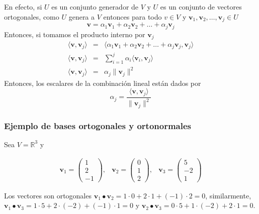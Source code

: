 \documentclass[
]{article}
\begin{document}
En efecto, si \(U\) es un conjunto generador de \(V\) y \(U\) es un
conjunto de vectores ortogonales, como \(U\) genera a \(V\) entonces
para todo \(v\in V\) y
\(\mathbf{v}_1,\mathbf{v}_2,\ldots,\mathbf{v}_j \in U\) \[
\mathbf{v}=\alpha_1 \mathbf{v}_1 + \alpha_2 \mathbf{v}_2 + \ldots + \alpha_j \mathbf{v}_j
\] Entonces, si tomamos el producto interno por \(\mathbf{v}_j\) \[
\begin{matrix}
\langle \mathbf{v}, \mathbf{v}_j \rangle  & = & 
  \langle \alpha_1 \mathbf{v}_1 + \alpha_2 \mathbf{v}_2 + \ldots + \alpha_j \mathbf{v}_j, \mathbf{v}_j \rangle \\
\langle \mathbf{v}, \mathbf{v}_j \rangle  & = & \sum_{i=1}^{j}\alpha_i \langle \mathbf{v}_i ,\mathbf{v}_j\rangle  \\
\langle \mathbf{v}, \mathbf{v}_j \rangle  & = & \alpha_j \|\mathbf{v}_j\|^2
\end{matrix}
\] Entonces, los escalares de la combinación lineal están dados por \[
\alpha_j = \frac{\langle \mathbf{v},\mathbf{v}_j  \rangle}{\|\mathbf{v}_j\|^2}
\]

\hypertarget{ejemplo-de-bases-ortogonales-y-ortonormales}{%
\subsubsection{Ejemplo de bases ortogonales y
ortonormales}\label{ejemplo-de-bases-ortogonales-y-ortonormales}}

Sea \(V=\mathbb{R}^{3}\) y

\[
\begin{array}{ccc}
\mathbf{v}_1 = 
               \begin{pmatrix} 1 \\ 2 \\ -1 \end{pmatrix}, & 
\mathbf{v}_2 = 
               \begin{pmatrix} 0 \\ 1 \\ 2 \end{pmatrix}, &
\mathbf{v}_3 = 
               \begin{pmatrix} 5 \\ -2 \\ 1 \end{pmatrix}               
\end{array}
\]

Los vectores son ortogonales
\(\mathbf{v}_1\bullet \mathbf{v}_2 = 1\cdot 0 + 2\cdot 1 + (-1)\cdot 2=0\),
similarmente,
\(\mathbf{v}_1\bullet \mathbf{v}_3 = 1\cdot 5 + 2\cdot(-2) + (-1)\cdot 1=0\)
y
\(\mathbf{v}_2\bullet \mathbf{v}_3 = 0\cdot 5 + 1\cdot (-2) + 2\cdot 1=0\).
\end{document}
